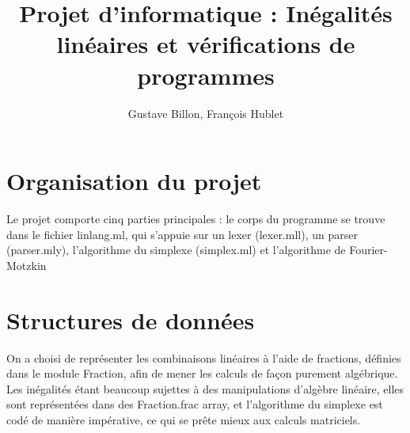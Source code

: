 \documentclass[a4paper]{article}
\title{Projet d'informatique : Inégalités linéaires et vérifications de programmes}
\author{Gustave Billon, François Hublet}
\begin{document}
\maketitle

\section{Organisation du projet}

Le projet comporte cinq parties principales : le corps du programme se trouve dans le fichier linlang.ml, qui s'appuie sur un lexer (lexer.mll), un parser (parser.mly), l'algorithme du simplexe (simplex.ml) et l'algorithme de Fourier-Motzkin

\section{Structures de données}

On a choisi de représenter les combinaisons linéaires à l'aide de fractions, définies dans le module Fraction, afin de mener les calculs de façon purement algébrique. Les inégalités étant beaucoup sujettes à des manipulations d'algèbre linéaire, elles sont représentées dans des Fraction.frac array, et l'algorithme du simplexe est codé de manière impérative, ce qui se prête mieux aux calculs matriciels.
\end{document}

